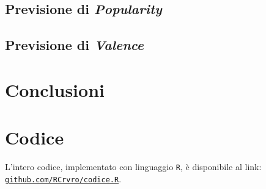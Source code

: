 \documentclass[fleqn,10pt]{SelfArx} %
\begin{document}
\subsection{Previsione di \textit{Popularity}}
\subsection{Previsione di \textit{Valence}}
\section{Conclusioni}

\section*{Codice}
L'intero codice, implementato con linguaggio \texttt{R}, è disponibile al link: \href{https://github.com/RCrvro/Foundation-of-Prob.-and-Stat.---Final-Project/blob/master/codice.R}{\texttt{github.com/RCrvro/codice.R}}.

\clearpage


\begin{thebibliography}{9}


\end{thebibliography}
\end{document}
